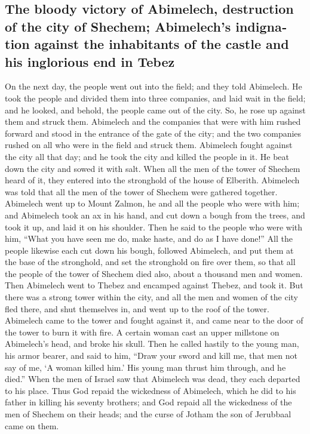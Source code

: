 \begin{paracol}{2}
\begin{otherlanguage}{english}
\hypertarget{the-bloody-victory-of-abimelech-destruction-of-the-city-of-shechem-abimelechs-indignation-against-the-inhabitants-of-the-castle-and-his-inglorious-end-in-tebez}{%
\subsection{The bloody victory of Abimelech, destruction of the city of
Shechem; Abimelech's indignation against the inhabitants of the castle
and his inglorious end in
Tebez}\label{the-bloody-victory-of-abimelech-destruction-of-the-city-of-shechem-abimelechs-indignation-against-the-inhabitants-of-the-castle-and-his-inglorious-end-in-tebez}}

 On the next day, the people went out into the field; and
they told Abimelech.  He took the people and divided them
into three companies, and laid wait in the field; and he looked, and
behold, the people came out of the city. So, he rose up against them and
struck them.  Abimelech and the companies that were with
him rushed forward and stood in the entrance of the gate of the city;
and the two companies rushed on all who were in the field and struck
them.  Abimelech fought against the city all that day;
and he took the city and killed the people in it. He beat down the city
and sowed it with salt.  When all the men of the tower of
Shechem heard of it, they entered into the stronghold of the house of
Elberith.  Abimelech was told that all the men of the
tower of Shechem were gathered together.  Abimelech went
up to Mount Zalmon, he and all the people who were with him; and
Abimelech took an ax in his hand, and cut down a bough from the trees,
and took it up, and laid it on his shoulder. Then he said to the people
who were with him, ``What you have seen me do, make haste, and do as I
have done!''  All the people likewise each cut down his
bough, followed Abimelech, and put them at the base of the stronghold,
and set the stronghold on fire over them, so that all the people of the
tower of Shechem died also, about a thousand men and women.
 Then Abimelech went to Thebez and encamped against
Thebez, and took it.  But there was a strong tower within
the city, and all the men and women of the city fled there, and shut
themselves in, and went up to the roof of the tower. 
Abimelech came to the tower and fought against it, and came near to the
door of the tower to burn it with fire.  A certain woman
cast an upper millstone on Abimelech's head, and broke his skull.
 Then he called hastily to the young man, his armor
bearer, and said to him, ``Draw your sword and kill me, that men not say
of me, `A woman killed him.' His young man thrust him through, and he
died.''  When the men of Israel saw that Abimelech was
dead, they each departed to his place.  Thus God repaid
the wickedness of Abimelech, which he did to his father in killing his
seventy brothers;  and God repaid all the wickedness of
the men of Shechem on their heads; and the curse of Jotham the son of
Jerubbaal came on them.


\end{otherlanguage}
\end{paracol}
